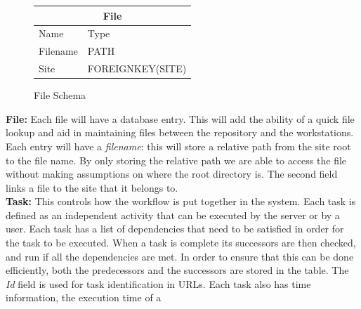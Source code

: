 \documentclass[12pt,a4paper]{report}
\begin{document}
\begin{figure}
\begin{tabular}{l|l}
    \multicolumn{2}{c}{File} \\
    \hline
    Name        & Type \\
    \hline
    Filename    & PATH  \\
    Site        & FOREIGNKEY(SITE)  \\
\end{tabular}
\caption{File Schema}
\end{figure}
\noindent\textbf{File:} Each file will have a database entry.
This will add the ability of a quick file lookup and aid in maintaining files between the
repository and the workstations. Each entry will have a \emph{filename}: this will store
a relative path from the site root to the file name. By only storing the relative path
we are able to access the file without making assumptions on where the root directory
is. The second field links a file to the site that it belongs to.
\\

\noindent \textbf{Task:} This controls how the workflow is put together in the system.
Each task is defined as an independent activity that can be executed by the server or
by a user. Each task has a list of dependencies that need to be satisfied in order
for the task to be executed. When a task is complete its successors are then checked,
and run if all the dependencies are met. In order to ensure that this can be
done efficiently, 
both the predecessors and the successors are stored in the table. The \emph{Id} field is
used for task identification in URLs. Each task also has time information, the execution
time of a
\end{document}
